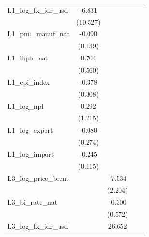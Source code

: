 {\begin{tabular}{l*{4}{c}}
L1\_log\_fx\_idr\_usd&   -6.831         &                  &                  &                  \\
                & (10.527)         &                  &                  &                  \\
\addlinespace
L1\_pmi\_manuf\_nat&   -0.090         &                  &                  &                  \\
                &  (0.139)         &                  &                  &                  \\
\addlinespace
L1\_ihpb\_nat     &    0.704         &                  &                  &                  \\
                &  (0.560)         &                  &                  &                  \\
\addlinespace
L1\_cpi\_index    &   -0.378         &                  &                  &                  \\
                &  (0.308)         &                  &                  &                  \\
\addlinespace
L1\_log\_npl      &    0.292         &                  &                  &                  \\
                &  (1.215)         &                  &                  &                  \\
\addlinespace
L1\_log\_export   &   -0.080         &                  &                  &                  \\
                &  (0.274)         &                  &                  &                  \\
\addlinespace
L1\_log\_import   &   -0.245\sym{**} &                  &                  &                  \\
                &  (0.115)         &                  &                  &                  \\
\addlinespace
L3\_log\_price\_brent&                  &   -7.534\sym{***}&                  &                  \\
                &                  &  (2.204)         &                  &                  \\
\addlinespace
L3\_bi\_rate\_nat  &                  &   -0.300         &                  &                  \\
                &                  &  (0.572)         &                  &                  \\
\addlinespace
L3\_log\_fx\_idr\_usd&                  &   26.652\sym{***}&                  &                  \\

\end{tabular}}
